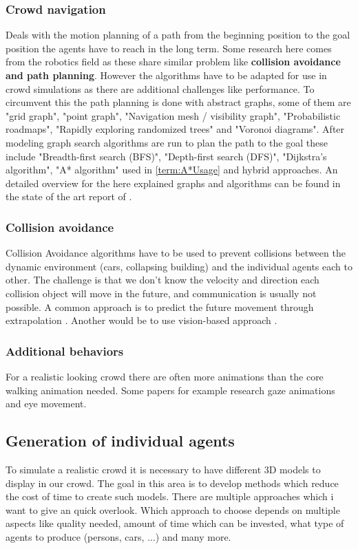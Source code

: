 \documentclass[sigconf]{acmart}
\begin{document}
\subsubsection{Crowd navigation}
Deals with the motion planning of a path from the beginning position to the goal position the agents have to reach in the long term. Some research here comes from the robotics field as these share similar problem like \textbf{collision avoidance and path planning}. However the algorithms have to be adapted for use in crowd simulations as there are additional challenges like performance. To circumvent this the path planning is done with abstract graphs, some of them are "grid graph", "point graph", "Navigation mesh / visibility graph", "Probabilistic roadmaps", "Rapidly exploring randomized trees" and "Voronoi diagrams". After modeling graph search algorithms are run to plan the path to the goal these include "Breadth-ﬁrst search (BFS)",  "Depth-ﬁrst search (DFS)", "Dijkstra’s algorithm", "A* algorithm" used in \ref{term:A*Usage} and hybrid approaches. An detailed overview for the here explained graphs and algorithms can be found in the state of the art report of \cite{jaros_crowd_2014}. 

\subsubsection{Collision avoidance}
Collision Avoidance algorithms have to be used to prevent collisions between the dynamic environment (cars, collapsing building) and the individual agents each to other. The challenge is that we don't know the velocity and direction each collision object will move in the future, and communication is usually not possible. A common approach is to predict the future movement through extrapolation \cite{karamouzas_predictive_2009}. Another would be to use vision-based approach \cite{ondrej_synthetic-vision_2010}.


\subsubsection{Additional behaviors}
For a realistic looking crowd there are often more animations than the core walking animation needed. Some papers for example research gaze animations and eye movement. 

\subsection{Generation of individual agents}
To simulate a realistic crowd it is necessary to have different 3D models to display in our crowd. The goal in this area is to develop methods which reduce the cost of time to create such models. There are multiple approaches which i want to give an quick overlook. Which approach to choose depends on multiple aspects like quality needed, amount of time which can be invested, what type of agents to produce (persons, cars, ...) and many more. 
\end{document}
